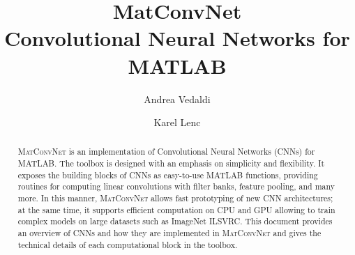 \documentclass[12pt]{memoir}
\title{MatConvNet \\
\Large
Convolutional Neural Networks for MATLAB}
\author{
Andrea Vedaldi
\and
Karel Lenc}
\date{}
\newcommand{\matconvnet}{\textsc{MatConvNet}\xspace}
\begin{document}


\frontmatter
\maketitle{}
\clearpage

\begin{abstract}
\matconvnet is an implementation of Convolutional Neural Networks (CNNs) for MATLAB. The toolbox is designed with an emphasis on simplicity and flexibility. It exposes the building blocks of CNNs as easy-to-use MATLAB functions, providing routines for computing linear convolutions with filter banks, feature pooling, and many more. In this manner, \matconvnet allows fast prototyping of new CNN architectures; at the same time, it supports efficient computation on CPU and GPU allowing to train complex models on large datasets such as ImageNet ILSVRC. This document provides an overview of CNNs and how they are implemented in \matconvnet and gives the technical details of each computational block in the toolbox.
\end{abstract}
\clearpage

\tableofcontents*
\clearpage

\mainmatter






\clearpage



\end{document}
